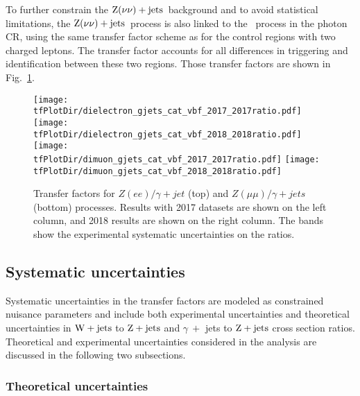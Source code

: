 To further constrain the $\mathrm{Z}(\nu\nu)+\textrm{jets}$~background and to avoid statistical limitations, the $\mathrm{Z}(\nu\nu)+\textrm{jets}$~process is also linked to the \phojets~process in the photon CR, 
using the same transfer factor scheme as for the control regions with two charged leptons. The transfer factor accounts for all differences in 
triggering and identification between these two regions. Those transfer factors are shown in Fig.~\ref{fig:transfer_factors_gamma}.

\begin{figure}[htbp]
    \centering
          \texttt{[image: \\tfPlotDir/dielectron\_gjets\_cat\_vbf\_2017\_2017ratio.pdf]}
          \texttt{[image: \\tfPlotDir/dielectron\_gjets\_cat\_vbf\_2018\_2018ratio.pdf]} \\
          \texttt{[image: \\tfPlotDir/dimuon\_gjets\_cat\_vbf\_2017\_2017ratio.pdf]}
          \texttt{[image: \\tfPlotDir/dimuon\_gjets\_cat\_vbf\_2018\_2018ratio.pdf]}
    \caption{Transfer factors for $Z(ee) / \gamma + jet$ (top) and $Z(\mu\mu) / \gamma + jets$ (bottom) processes. 
    Results with 2017 datasets are shown on the left column, and 2018 results are shown on the right column.
    The bands show the experimental systematic uncertainties on the ratios.}
    \label{fig:transfer_factors_gamma}
\end{figure}

\clearpage

\subsection{Systematic uncertainties}
\label{subsec:sys_uncertainties}

Systematic uncertainties in the transfer factors are modeled as constrained nuisance parameters and include both
experimental uncertainties and theoretical uncertainties in $\mathrm{W}+\textrm{jets}$ to $\mathrm{Z}+\textrm{jets}$ and $\gamma \ +$ jets 
to $\mathrm{Z}+\textrm{jets}$ cross section ratios. Theoretical and experimental uncertainties considered in the analysis are discussed
in the following two subsections.

\subsubsection{Theoretical uncertainties}

